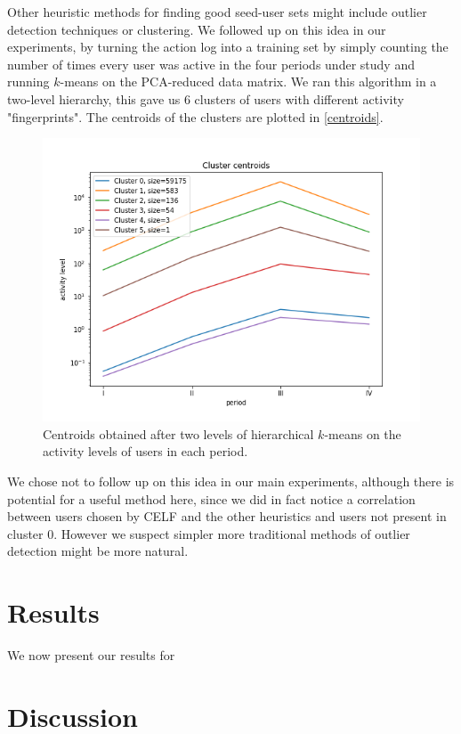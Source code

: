 \documentclass[sigconf]{acmart}
\begin{document}
Other heuristic methods for finding good seed-user sets might include outlier detection techniques or clustering. We followed up on this idea in our experiments, by turning the action log into a training set by simply counting the number of times every user was active in the four periods under study and running $k$-means on the PCA-reduced data matrix. We ran this algorithm in a two-level hierarchy, this gave us 6 clusters of users with different activity "fingerprints". The centroids of the clusters are plotted in \autoref{centroids}.

\begin{figure}[htbp]
\begin{center}
\includegraphics[width=0.9\linewidth]{./Figures/centroids.png}
\caption{Centroids obtained after two levels of hierarchical $k$-means on the activity levels of users in each period.}
\label{centroids}
\end{center}
\end{figure}

We chose not to follow up on this idea in our main experiments, although there is potential for a useful method here, since we did in fact notice a correlation between users chosen by CELF and the other heuristics and users not present in cluster 0. However we suspect simpler more traditional methods of outlier detection might be more natural.  

\section{Results}

We now present our results for 


\section{Discussion}
\end{document}
